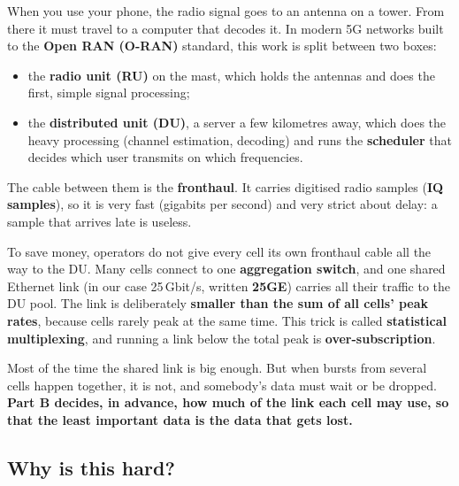 \documentclass[11pt,a4paper]{article}
\begin{document}
When you use your phone, the radio signal goes to an antenna on a tower. From there it must travel to a computer that decodes it. In modern 5G networks built to the \textbf{Open RAN (O-RAN)} standard, this work is split between two boxes:
\begin{itemize}
  \item the \textbf{radio unit (RU)} on the mast, which holds the antennas and does the first, simple signal processing;
  \item the \textbf{distributed unit (DU)}, a server a few kilometres away, which does the heavy processing (channel estimation, decoding) and runs the \textbf{scheduler} that decides which user transmits on which frequencies.
\end{itemize}
The cable between them is the \textbf{fronthaul}. It carries digitised radio samples (\textbf{IQ samples}), so it is very fast (gigabits per second) and very strict about delay: a sample that arrives late is useless.

To save money, operators do not give every cell its own fronthaul cable all the way to the DU. Many cells connect to one \textbf{aggregation switch}, and one shared Ethernet link (in our case 25\,Gbit/s, written \textbf{25GE}) carries all their traffic to the DU pool. The link is deliberately \textbf{smaller than the sum of all cells' peak rates}, because cells rarely peak at the same time. This trick is called \textbf{statistical multiplexing}, and running a link below the total peak is \textbf{over-subscription}.

\begin{plain}
Most of the time the shared link is big enough. But when bursts from several cells happen together, it is not, and somebody's data must wait or be dropped. \textbf{Part B decides, in advance, how much of the link each cell may use, so that the least important data is the data that gets lost.}
\end{plain}

\subsection{Why is this hard?}
\end{document}
